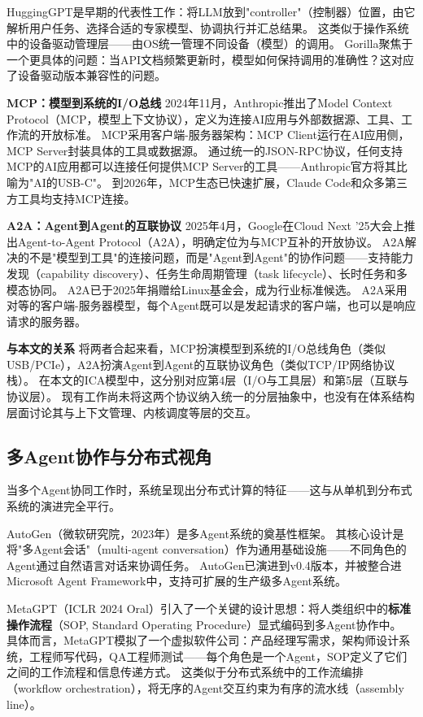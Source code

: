 HuggingGPT\cite{hugginggpt2023}是早期的代表性工作：将LLM放到"controller"（控制器）位置，由它解析用户任务、选择合适的专家模型、协调执行并汇总结果。
这类似于操作系统中的设备驱动管理层——由OS统一管理不同设备（模型）的调用。
Gorilla\cite{patil2024gorilla}聚焦于一个更具体的问题：当API文档频繁更新时，模型如何保持调用的准确性？这对应了设备驱动版本兼容性的问题。

\textbf{MCP：模型到系统的I/O总线}
2024年11月，Anthropic推出了Model Context Protocol（MCP，模型上下文协议）\cite{mcp_intro_2026}，定义为连接AI应用与外部数据源、工具、工作流的开放标准。
MCP采用客户端-服务器架构：MCP Client运行在AI应用侧，MCP Server封装具体的工具或数据源。
通过统一的JSON-RPC协议，任何支持MCP的AI应用都可以连接任何提供MCP Server的工具——Anthropic官方将其比喻为"AI的USB-C"。
到2026年，MCP生态已快速扩展，Claude Code\cite{anthropic_claudecode_mcp_2026}和众多第三方工具均支持MCP连接。

\textbf{A2A：Agent到Agent的互联协议}
2025年4月，Google在Cloud Next '25大会上推出Agent-to-Agent Protocol（A2A）\cite{google_a2a_2025}，明确定位为与MCP互补的开放协议。
A2A解决的不是"模型到工具"的连接问题，而是"Agent到Agent"的协作问题——支持能力发现（capability discovery）、任务生命周期管理（task lifecycle）、长时任务和多模态协同。
A2A已于2025年捐赠给Linux基金会，成为行业标准候选。
A2A采用对等的客户端-服务器模型，每个Agent既可以是发起请求的客户端，也可以是响应请求的服务器。

\textbf{与本文的关系}
将两者合起来看，MCP扮演模型到系统的I/O总线角色（类似USB/PCIe），A2A扮演Agent到Agent的互联协议角色（类似TCP/IP网络协议栈）。
在本文的ICA模型中，这分别对应第4层（I/O与工具层）和第5层（互联与协议层）。
现有工作尚未将这两个协议纳入统一的分层抽象中，也没有在体系结构层面讨论其与上下文管理、内核调度等层的交互。

\subsection{多Agent协作与分布式视角}
\label{sec:related-multiagent}

当多个Agent协同工作时，系统呈现出分布式计算的特征——这与从单机到分布式系统的演进完全平行。

AutoGen\cite{wu2023autogen}（微软研究院，2023年）是多Agent系统的奠基性框架。
其核心设计是将"多Agent会话"（multi-agent conversation）作为通用基础设施——不同角色的Agent通过自然语言对话来协调任务。
AutoGen已演进到v0.4版本，并被整合进Microsoft Agent Framework中，支持可扩展的生产级多Agent系统。

MetaGPT\cite{metagpt2023}（ICLR 2024 Oral）引入了一个关键的设计思想：将人类组织中的\textbf{标准操作流程}（SOP, Standard Operating Procedure）显式编码到多Agent协作中。
具体而言，MetaGPT模拟了一个虚拟软件公司：产品经理写需求，架构师设计系统，工程师写代码，QA工程师测试——每个角色是一个Agent，SOP定义了它们之间的工作流程和信息传递方式。
这类似于分布式系统中的工作流编排（workflow orchestration），将无序的Agent交互约束为有序的流水线（assembly line）。


